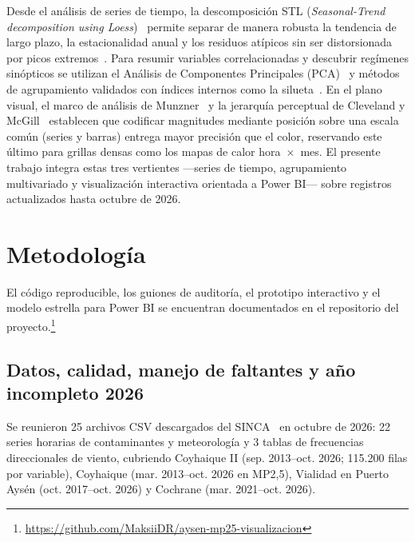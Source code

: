 \documentclass[conference]{IEEEtran}
\begin{document}
Desde el an{\'a}lisis de series de tiempo, la descomposici{\'o}n STL (\textit{Seasonal-Trend decomposition using Loess})~\cite{cleveland1990stl} permite separar de manera robusta la tendencia de largo plazo, la estacionalidad anual y los residuos at{\'i}picos sin ser distorsionada por picos extremos~\cite{hyndman2021}. Para resumir variables correlacionadas y descubrir reg{\'i}menes sin{\'o}pticos se utilizan el An{\'a}lisis de Componentes Principales (PCA)~\cite{jolliffe2016} y m{\'e}todos de agrupamiento validados con {\'i}ndices internos como la silueta~\cite{rousseeuw1987}. En el plano visual, el marco de an{\'a}lisis de Munzner~\cite{munzner2014} y la jerarqu{\'i}a perceptual de Cleveland y McGill~\cite{cleveland1984} establecen que codificar magnitudes mediante posici{\'o}n sobre una escala com{\'u}n (series y barras) entrega mayor precisi{\'o}n que el color, reservando este {\'u}ltimo para grillas densas como los mapas de calor hora~$\times$~mes. El presente trabajo integra estas tres vertientes ---series de tiempo, agrupamiento multivariado y visualizaci{\'o}n interactiva orientada a Power BI--- sobre registros actualizados hasta octubre de 2026.

\section{Metodolog{\'i}a}

El c{\'o}digo reproducible, los guiones de auditor{\'i}a, el prototipo interactivo y el modelo estrella para Power BI se encuentran documentados en el repositorio del proyecto.\footnote{\url{https://github.com/MaksiiDR/aysen-mp25-visualizacion}}

\subsection{Datos, calidad, manejo de faltantes y a{\~n}o incompleto 2026}
Se reunieron 25 archivos CSV descargados del SINCA~\cite{sinca2026} en octubre de 2026: 22 series horarias de contaminantes y meteorolog{\'i}a y 3 tablas de frecuencias direccionales de viento, cubriendo Coyhaique II (sep. 2013--oct. 2026; 115.200 filas por variable), Coyhaique (mar. 2013--oct. 2026 en MP2,5), Vialidad en Puerto Ays{\'e}n (oct. 2017--oct. 2026) y Cochrane (mar. 2021--oct. 2026).
\end{document}
